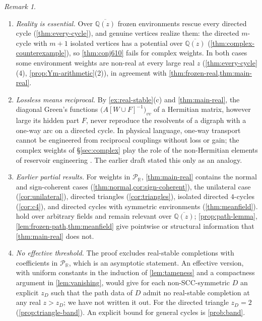 \documentclass[11pt]{amsart}
\theoremstyle{plain}
\theoremstyle{definition}
\theoremstyle{remark}
\newtheorem{remark}[theorem]{Remark}
\numberwithin{equation}{section}
\newcommand{\QQ}{\mathbb{Q}}
\newcommand{\RR}{\mathbb{R}}
\newcommand{\Qzbar}{\overline{\QQ(z)}}
\newcommand{\Puis}{\mathcal{P}_{\RR}}
\begin{document}
\begin{remark}\label{rem:scope}
\begin{enumerate}[label=(\arabic*)]
\item \emph{Reality is essential.} Over $\Qzbar$ frozen environments rescue every directed cycle (\cref{thm:every-cycle}), and genuine vertices realize them: the directed $m$-cycle with $m+1$ isolated vertices has a potential over $\Qzbar$ (\cref{thm:complex-counterexample}), so \cref{thm:conj610} fails for complex weights. In both cases some environment weights are non-real at every large real $z$ (\cref{thm:every-cycle}(4), \cref{prop:Ym-arithmetic}(2)), in agreement with \cref{thm:frozen-real,thm:main-real}.
\item \emph{Lossless means reciprocal.} By \cref{ex:real-stable}(c) and \cref{thm:main-real}, the diagonal Green's functions $\bigl(A[W\cup F]^{-1}\bigr)_{vv}$ of a Hermitian matrix, however large its hidden part $F$, never reproduce the resolvents of a digraph with a one-way arc on a directed cycle. In physical language, one-way transport cannot be engineered from reciprocal couplings without loss or gain; the complex weights of \S\ref{sec:complex} play the role of the non-Hermitian elements of reservoir engineering \cite{MetelmannClerk}. The earlier draft stated this only as an analogy.
\item \emph{Earlier partial results.} For weights in $\Puis$, \cref{thm:main-real} contains the normal and sign-coherent cases (\cref{thm:normal,cor:sign-coherent}), the unilateral case (\cref{cor:unilateral}), directed triangles (\cref{cor:triangles}), isolated directed $4$-cycles (\cref{cor:c4}), and directed cycles with symmetric environments (\cref{thm:meanfield}).  hold over arbitrary fields and remain relevant over $\Qzbar$; \cref{prop:path-lemma}, \cref{lem:frozen-path,thm:meanfield} give pointwise or structural information that \cref{thm:main-real} does not.
\item \emph{No effective threshold.} The proof excludes real-stable completions with coefficients in $\Puis$, which is an asymptotic statement. An effective version, with uniform constants in the induction of \cref{lem:tameness} and a compactness argument in \cref{lem:vanishing}, would give for each non-SCC-symmetric $D$ an explicit $z_D$ such that the path data of $D$ admit no real-stable completion at any real $z>z_D$; we have not written it out. For the directed triangle $z_D=2$ (\cref{prop:triangle-band}). An explicit bound for general cycles is \cref{prob:band}.
\end{enumerate}
\end{remark}
\end{document}
